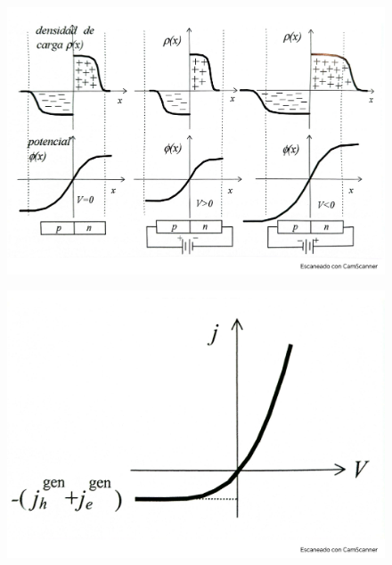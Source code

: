 \begin{figure}[h!] \centering
	\includegraphics[scale=0.5]{Cuerpo/Ch_09/Fotos libro 7.pdf}
	\caption{}
	\label{Fig:09-07}
\end{figure}
\begin{figure}[h!] \centering
	\includegraphics[scale=0.5]{Cuerpo/Ch_09/Fotos libro 8.pdf}
	\caption{}
	\label{Fig:09-08}
\end{figure}